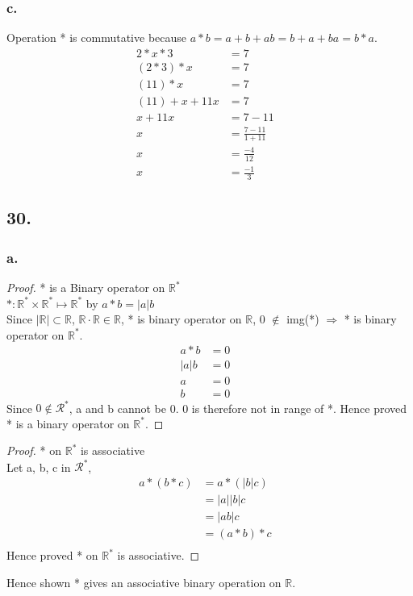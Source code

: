 \documentclass{article}
\begin{document}
\subsubsection*{c.}
	\begin{addmargin}[1em]{1em}
		Operation * is commutative because $a*b = a+b+ab = b+a+ba = b*a$.
		\begin{align*}
			2*x*3 &= 7 &\\
			(2*3)*x &= 7&\\
			(11)*x &= 7&\\
			(11) + x +11x &= 7&\\
			x +11x &= 7-11&\\
			x &= \frac{7-11}{1+11}&\\
			x &= \frac{-4}{12}&\\
			x &= \frac{-1}{3}&
		\end{align*}
	\end{addmargin}

\subsection*{30.}
\subsubsection*{a.}
	\begin{addmargin}[1em]{1em}
		\begin{proof} * is a Binary operator on $\mathbb{R}^*$\\
			$*:\mathbb{R}^*\times \mathbb{R}^* \mapsto \mathbb{R}^*$ by $a*b =
			|a|b$\\
			Since $|\mathbb{R}| \subset \mathbb{R}$, $\mathbb{R} \cdot \mathbb{R} \in
			\mathbb{R}$, * is binary operator on $\mathbb{R}$, 0 $\notin$ img(*) 
			$\Rightarrow$ * is binary operator on $\mathbb{R}^*$.
			\begin{align*}
				a*b &= 0&\\
				|a|b &= 0&\\
					a &= 0 &\\
					b &= 0 &
			\end{align*}
			Since $0 \notin \mathcal{R}^*$, a and b cannot be 0. 0 is therefore not
			in range of *. Hence proved * is a binary operator on $\mathbb{R}^*$.
		\end{proof}

		\begin{proof} * on $\mathbb{R}^*$ is associative\\
			Let a, b, c in $\mathcal{R}^*$,
			\begin{align*}
				a*(b*c) &= a*(|b|c)&\\
								&= |a||b|c&\\
								&= |ab|c&\\
								&= (a*b)*c\\
			\end{align*}
			Hence proved * on $\mathbb{R}^*$ is associative.
		\end{proof}
		\noindent
		Hence shown * gives an associative binary operation on $\mathbb{R}$.
	\end{addmargin}
\end{document}
